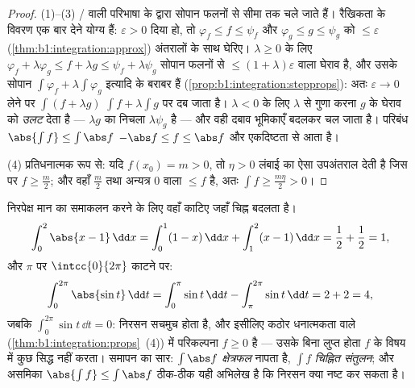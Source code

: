 \begin{proof}
(1)--(3) / वाली परिभाषा के द्वारा सोपान फलनों से सीमा तक चले
जाते हैं। रैखिकता के विवरण एक बार देने योग्य हैं: $\varepsilon > 0$ दिया हो,
तो $\varphi_f \leq f \leq \psi_f$ और $\varphi_g \leq g \leq \psi_g$ को $\leq
\varepsilon$ (\cref{thm:b1:integration:approx}) अंतरालों के साथ घेरिए।
$\lambda \geq 0$ के लिए $\varphi_f + \lambda\varphi_g \leq f + \lambda g
\leq \psi_f + \lambda\psi_g$ सोपान फलनों से $\leq (1 + \lambda)\varepsilon$
 वाला घेराव है, और उसके सोपान  $\int \varphi_f +
\lambda\int\varphi_g$ इत्यादि के बराबर हैं
(\cref{prop:b1:integration:stepprops}): अतः $\varepsilon \to 0$ लेने पर
$\int(f + \lambda g)$ $\int f + \lambda\int g$ पर दब जाता है। $\lambda < 0$
के लिए $\lambda$ से गुणा करना $g$ के घेराव को \emph{उलट} देता है ---
$\lambda g$ का निचला  $\lambda \psi_g$ है --- और वही दबाव भूमिकाएँ
बदलकर चल जाता है। परिबंध $\abs{\int f} \leq \int \abs f$ $-\abs f \leq f
\leq \abs f$ और एकदिष्टता से आता है।

(4) प्रतिधनात्मक रूप से: यदि $f(x_0) = m > 0$, तो  $\eta > 0$ लंबाई
का ऐसा उपअंतराल देती है जिस पर $f \geq \frac m2$; और वहाँ $\frac m2$ तथा
अन्यत्र $0$ वाला  $\leq f$ है, अतः $\int f \geq \frac{m\eta}{2} >
0$।
\end{proof}

\begin{example}[शाल काम पर: निरपेक्ष मान वाले समाकल]\label{ex:b1:integration:chasleswork}
निरपेक्ष मान का समाकलन करने के लिए वहाँ काटिए जहाँ चिह्न बदलता है।
\[
\int_0^2 \abs{x - 1}\,\dd x
= \int_0^1 (1 - x)\,\dd x + \int_1^2 (x - 1)\,\dd x
= \frac12 + \frac12 = 1 ,
\]
और $\pi$ पर $\intcc{0}{2\pi}$ काटने पर:
\[
\int_0^{2\pi} \abs{\sin t}\,\dd t
= \int_0^{\pi} \sin t\,\dd t - \int_{\pi}^{2\pi} \sin t\,\dd t
= 2 + 2 = 4 ,
\]
जबकि $\int_0^{2\pi} \sin t\,\dd t = 0$: निरसन सचमुच होता है, और इसीलिए कठोर
धनात्मकता वाले  (\cref{thm:b1:integration:props}~(4)) में परिकल्पना $f
\geq 0$ है --- उसके बिना लुप्त होता  $f$ के विषय में कुछ सिद्ध नहीं
करता। समापन का सार: $\int \abs f$ \emph{क्षेत्रफल} नापता है, $\int f$
\emph{चिह्नित संतुलन}; और असमिका $\abs{\int f} \leq \int\abs f$ ठीक-ठीक यही
अभिलेख है कि निरसन क्या नष्ट कर सकता है।
\end{example}


